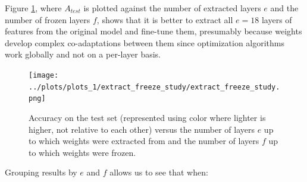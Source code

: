 Figure \ref{fig:vgg16_extract_freeze_study}, where $A_{test}$ is plotted against the number of extracted layers $e$ and the number of frozen layers $f$, shows that it is better to extract all $e = 18$ layers of features from the original model and fine-tune them, presumably because weights develop complex co-adaptations between them since optimization algorithms work globally and not on a per-layer basis.

\begin{figure}[ht]
    \centering
    \texttt{[image: ../plots/plots\_1/extract\_freeze\_study/extract\_freeze\_study.png]}
    \caption{Accuracy on the test set (represented using color where lighter is higher, not relative to each other) versus the number of layers $e$ up to which weights were extracted from and the number of layers $f$ up to which weights were frozen.}
    \label{fig:vgg16_extract_freeze_study}
\end{figure}

Grouping results by $e$ and $f$ allows us to see that when:

